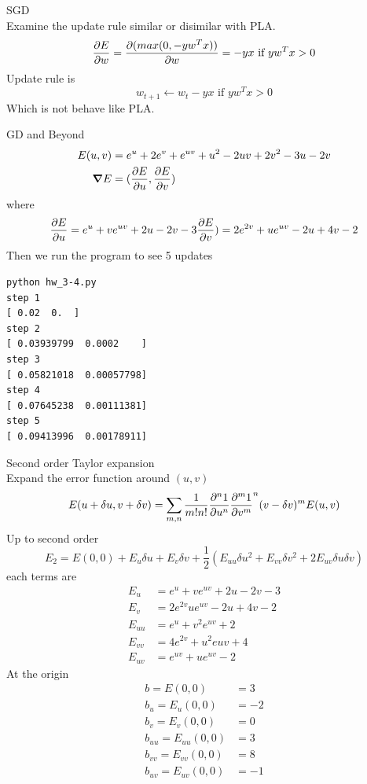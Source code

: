 \documentclass[12pt]{article}
\newenvironment{prob}[2][Prob.]{\begin{trivlist}
\item[\hskip \labelsep {\bfseries #1}\hskip \labelsep {\bfseries #2}]}{\end{trivlist}}
\begin{document}
\begin{CJK}{UTF8}{bsmi}
\begin{prob}{3} - SGD\\
Examine the update rule similar or disimilar with PLA.
\[
    \pdv{E}{w} = \pdv{(max(0, -yw^Tx))}{w} = -yx \text{  if  } yw^Tx > 0
\]
Update rule is 
\[
    w_{t+1} \leftarrow w_t -yx \text{  if  } yw^Tx > 0
\]
Which is not behave like PLA.
\end{prob}

\begin{prob}{4} - GD and Beyond \\
\begin{align*}
    E(u,v) & = e^u + 2e^v + e^{uv} + u^2 -2uv + 2v^2 -3u - 2v \\
    \grad{E} & = (\pdv{E}{u}, \pdv{E}{v}) \\
\end{align*}
where 
\[
    \pdv{E}{u} = e^u + ve^{uv} + 2u -2v -3 \\
    \pdv{E}{v}) = 2e^{2v} + ue^{uv} -2u +4v -2
\]
Then we run the program to see 5 updates
\begin{lstlisting}
python hw_3-4.py
step 1
[ 0.02  0.  ]
step 2
[ 0.03939799  0.0002    ]
step 3
[ 0.05821018  0.00057798]
step 4
[ 0.07645238  0.00111381]
step 5
[ 0.09413996  0.00178911]
\end{lstlisting}
\end{prob}

\begin{prob}{5} - Second order Taylor expansion\\
Expand the error function around $(u,v)$
\[
    E(u+\delta u ,v+\delta v) = \sum_{m,n} \frac{1}{m!n!}\pdv[n]{1}{u}\pdv[m]{1}{v} (u - \delta u)^n (v - \delta v)^m E(u,v)
\]
Up to second order
\[
    E_2 = E(0,0) + E_u\delta u + E_v\delta v + \frac{1}{2}(E_{uu}\delta u^2 + E_{vv}\delta v^2 + 2E_{uv}\delta u \delta v)
\]
each terms are
\begin{align*}
E_u & = e^u + ve^{uv}+2u-2v-3 \\
E_v &= 2e^{2v} ue^{uv} -2u +4v -2\\
E_{uu} &= e^u + v^2e^{uv} + 2 \\
E_{vv} &= 4e^{2v} + u^2e{uv} +4 \\
E_{uv} &= e^{uv} + ue^{uv} -2 
\end{align*}
At the origin
\begin{align*}
b = E(0,0) &= 3 \\
b_u = E_u(0,0) & = -2 \\
b_v = E_v(0,0) &= 0 \\
b_{uu} = E_{uu}(0,0) &= 3 \\
b_{vv} = E_{vv}(0,0) &= 8 \\
b_{uv} = E_{uv}(0,0) &= -1
\end{align*}
\end{prob}


\end{CJK}
\end{document}
